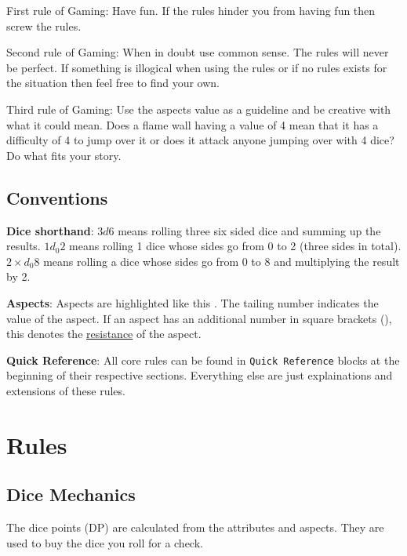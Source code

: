 \documentclass[11pt]{article}
\begin{document}
{First rule of Gaming: Have fun. If the rules hinder you from having fun then screw the rules.

Second rule of Gaming: When in doubt use common sense. The rules will never be perfect. If something is illogical when using the rules or if no rules exists for the situation then feel free to find your own. 

Third rule of Gaming: Use the aspects value as a guideline and be creative with what it could mean. Does a flame wall having a value of 4 mean that it has a difficulty of 4 to jump over it or does it attack anyone jumping over with 4 dice? Do what fits your story. 
\subsection{Conventions}
\label{sec:org23a9bbe}
\textbf{Dice shorthand}: \(3 d 6\) means rolling three six sided dice and summing up the results. \(1 d_0 2\) means rolling 1 dice whose sides go from 0 to 2 (three sides in total). \(2 \times d_0 8\) means rolling a dice whose sides go from 0 to 8 and multiplying the result by 2.

\textbf{Aspects}: Aspects are highlighted like this . The tailing number indicates the value of the aspect. If an aspect has an additional number in square brackets (), this denotes the \hyperref[sec:org73f5544]{resistance} of the aspect. 

\textbf{Quick Reference}: All core rules can be found in \texttt{Quick Reference} blocks at the beginning of their respective sections. Everything else are just explainations and extensions of these rules.
\section{Rules}
\label{sec:org2e800e1}

\subsection{Dice Mechanics}
\label{sec:orge08f121}
\begin{short}
The dice points (DP) are calculated from the attributes and aspects. They are used to buy the dice you roll for a check.


\end{short}}
\end{document}
